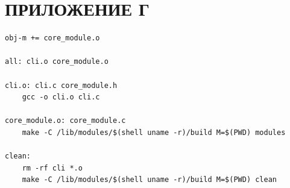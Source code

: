 \documentclass{bmstu}
\begin{document}
\chapter*{ПРИЛОЖЕНИЕ Г}
\begin{lstlisting}[caption = {Makefile}]
obj-m += core_module.o

all: cli.o core_module.o

cli.o: cli.c core_module.h
	gcc -o cli.o cli.c	

core_module.o: core_module.c
	make -C /lib/modules/$(shell uname -r)/build M=$(PWD) modules

clean:
	rm -rf cli *.o
	make -C /lib/modules/$(shell uname -r)/build M=$(PWD) clean
\end{lstlisting}
\end{document}
